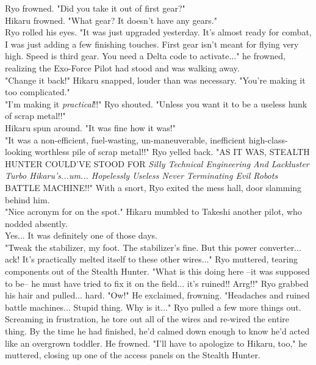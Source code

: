 \documentclass[11pt,twoside,a4paper]{book}
\begin{document}
\begin{multicols*}{2}
Ryo frowned. "Did you take it out of first gear?" ~\\

Hikaru frowned. "What gear? It doesn't have any gears." ~\\

Ryo rolled his eyes. "It was just upgraded yesterday. It's almost ready for combat, I was just adding a few finishing touches. First gear isn't meant for flying very high. Speed is third gear. You need a Delta code to activate..." he frowned, realizing the Exo-Force Pilot had stood and was walking away. ~\\

"Change it back!" Hikaru snapped, louder than was necessary. "You're making it too complicated." ~\\


"I'm making it \emph{practical}!!" Ryo shouted. "Unless you want it to be a useless hunk of scrap metal!!" ~\\

Hikaru spun around. "It was fine how it was!" ~\\

"It was a non-efficient, fuel-wasting, un-maneuverable, inefficient high-class-looking worthless pile of scrap metal!!" Ryo yelled back. "AS IT WAS, STEALTH HUNTER COULD'VE STOOD FOR \emph{Silly Technical Engineering And Lackluster Turbo Hikaru's...um... Hopelessly Useless Never Terminating Evil Robots} BATTLE MACHINE!!" With a snort, Ryo exited the mess hall, door slamming behind him. ~\\

"Nice acronym for on the spot." Hikaru mumbled to Takeshi another pilot, who nodded absently. ~\\

Yes... It was definitely one of those days. ~\\

"Tweak the stabilizer, my foot. The stabilizer's fine. But this power converter... ack! It's practically melted itself to these other wires..." Ryo muttered, tearing components out of the Stealth Hunter. "What is this doing here --it was supposed to be-- he must have tried to fix it on the field... it's ruined!! Arrg!!" Ryo grabbed his hair and pulled... hard. "Ow!" He exclaimed, frowning. "Headaches and ruined battle machines... Stupid thing. Why is it..." Ryo pulled a few more things out. Screaming in frustration, he tore out all of the wires and re-wired the entire thing. By the time he had finished, he'd calmed down enough to know he'd acted like an overgrown toddler. He frowned. "I'll have to apologize to Hikaru, too," he muttered, closing up one of the access panels on the Stealth Hunter. ~\\


\end{multicols*}
\end{document}
